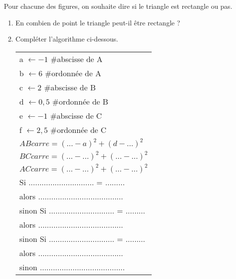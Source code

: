 \begin{minipage}{0.48\linewidth}

Pour chacune des figures, on souhaite dire si le triangle est rectangle ou pas.

\begin{enumerate}
\item En combien de point le triangle peut-il être rectangle ?
\item Compléter l'algorithme ci-dessous.

\begin{tabular}{l}
\hline 
a $\longleftarrow -1$ \#abscisse de A \\
b $\longleftarrow 6$ \#ordonnée de A \\
c $\longleftarrow 2$ \#abscisse de B \\
d $\longleftarrow 0,5$ \#ordonnée de B \\
e $\longleftarrow -1$  \#abscisse de C \\
f $\longleftarrow 2,5$  \#ordonnée de C\\

$ABcarre = ( \ldots - a )^2 + ( d - \ldots )^2$\\
$BCcarre = ( \ldots - \ldots )^2 + ( \ldots - \ldots )^2$\\
$ACcarre = ( \ldots - \ldots )^2 + ( \ldots - \ldots )^2$\\

Si $ \ldots \ldots \ldots \ldots \ldots \ldots \ldots \ldots \ldots \ldots$ = $\ldots \ldots \ldots $\\
alors $ \ldots \ldots \ldots \ldots \ldots \ldots \ldots \ldots \ldots \ldots \ldots \ldots \ldots $\\
sinon Si $ \ldots \ldots \ldots \ldots \ldots \ldots \ldots \ldots \ldots \ldots$ = $\ldots \ldots \ldots $\\
alors $ \ldots \ldots \ldots \ldots \ldots \ldots \ldots \ldots \ldots \ldots \ldots \ldots \ldots $\\
sinon Si $  \ldots \ldots \ldots \ldots \ldots\ldots \ldots \ldots \ldots \ldots $ = $\ldots \ldots \ldots $\\
alors $ \ldots \ldots \ldots \ldots \ldots \ldots \ldots \ldots \ldots \ldots\ldots \ldots \ldots $\\
sinon $ \ldots \ldots \ldots \ldots \ldots \ldots \ldots \ldots \ldots \ldots\ldots \ldots \ldots $\\
\hline 
\end{tabular} 
\end{enumerate}
\end{minipage}
